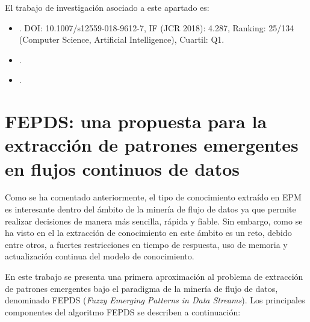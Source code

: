 \documentclass[c5paper,10pt,twoside]{book}	   	%
\begin{document}
El trabajo de investigación asociado a este apartado es:

\begin{itemize}
	\item {}. DOI: 10.1007/s12559-018-9612-7, IF (JCR 2018): 4.287, Ranking: 25/134 (Computer Science, Artificial Intelligence), Cuartil: Q1.
	
	\item {}.
	\item {}.
\end{itemize}








\section{FEPDS: una propuesta para la extracción de patrones emergentes en flujos continuos de datos} \label{sec:streaming}
 
 
Como se ha comentado anteriormente, el tipo de conocimiento extraído en \ac{EPM} es interesante dentro del ámbito de la minería de flujo de datos ya que permite realizar decisiones de manera más sencilla, rápida y fiable. Sin embargo, como se ha visto en el  la extracción de conocimiento en este ámbito es un reto, debido entre otros, a fuertes restricciones en tiempo de respuesta, uso de memoria y actualización continua del modelo de conocimiento.

En este trabajo se presenta una primera aproximación al problema de extracción de patrones emergentes bajo el paradigma de la minería de flujo de datos, denominado FEPDS (\textit{Fuzzy Emerging Patterns in Data Streams}). Los principales componentes del algoritmo FEPDS se describen a continuación:
\end{document}
